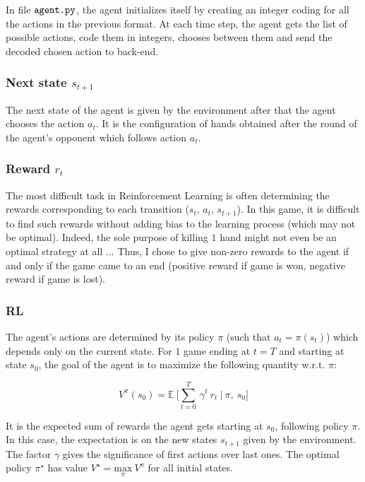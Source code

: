 \documentclass{article}
\begin{document}
In file $\verb|agent.py|$, the agent initializes itself by creating an integer coding for all the actions in the previous format. At each time step, the agent gets the list of possible actions, code them in integers, chooses between them and send the decoded chosen action to back-end.

\subsubsection*{Next state $s_{t+1}$}

The next state of the agent is given by the environment after that the agent chooses the action $a_t$. It is the configuration of hands obtained after the round of the agent's opponent which follows action $a_t$.

\subsubsection*{Reward $r_t$}

The most difficult task in Reinforcement Learning is often determining the rewards corresponding to each transition ($s_t$, $a_t$, $s_{t+1}$). In this game, it is difficult to find such rewards without adding bias to the learning process (which may not be optimal). Indeed, the sole purpose of killing $1$ hand might not even be an optimal strategy at all ... Thus, I chose to give non-zero rewards to the agent if and only if the game came to an end (positive reward if game is won, negative reward if game is lost). 

\subsubsection*{RL}

The agent's actions are determined by its policy $\pi$ (such that $a_t = \pi(s_t)$) which depends only on the current state. For $1$ game ending at $t = T$ and starting at state $s_0$, the goal of the agent is to maximize the following quantity w.r.t. $\pi$:

\begin{equation}
    V^\pi(s_0) = \mathbb{E} \ \bigg[\sum_{t=0}^T \ \gamma^t \ r_t \ | \ \pi, \ s_0\bigg]
\end{equation}{}

It is the expected sum of rewards the agent gets starting at $s_0$, following policy $\pi$. In this case, the expectation is on the new states $s_{t+1}$ given by the environment. The factor $\gamma$ gives the significance of first actions over last ones. The optimal policy $\pi^\star$ has value $V^\star = \underset{\pi}{\text{max}} \ V^\pi$ for all initial states.
\end{document}

